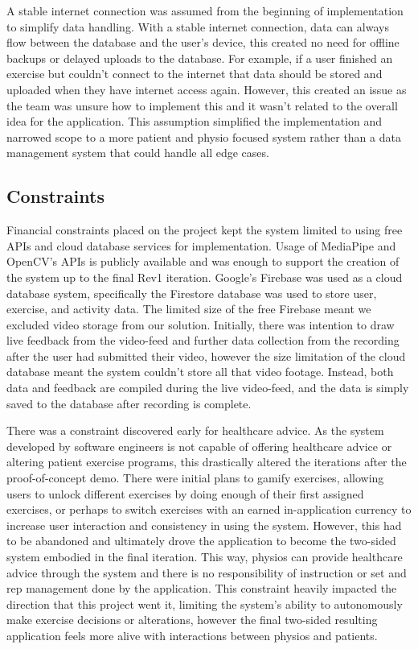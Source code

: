 \documentclass{article}
\begin{document}
A stable internet connection was assumed from the beginning of implementation to simplify data handling. With a stable internet connection, data can always flow between the database and the user’s device, this created no need for offline backups or delayed uploads to the database. For example, if a user finished an exercise but couldn’t connect to the internet that data should be stored and uploaded when they have internet access again. However, this created an issue as the team was unsure how to implement this and it wasn’t related to the overall idea for the application. This assumption simplified the implementation and narrowed scope to a more patient and physio focused system rather than a data management system that could handle all edge cases.

\subsection{Constraints}

Financial constraints placed on the project kept the system limited to using free APIs and cloud database services for implementation. Usage of MediaPipe and OpenCV’s APIs is publicly available and was enough to support the creation of the system up to the final Rev1 iteration. Google’s Firebase was used as a cloud database system, specifically the Firestore database was used to store user, exercise, and activity data. The limited size of the free Firebase meant we excluded video storage from our solution. Initially, there was intention to draw live feedback from the video-feed and further data collection from the recording after the user had submitted their video, however the size limitation of the cloud database meant the system couldn’t store all that video footage. Instead, both data and feedback are compiled during the live video-feed, and the data is simply saved to the database after recording is complete. 

There was a constraint discovered early for healthcare advice. As the system developed by software engineers is not capable of offering healthcare advice or altering patient exercise programs, this drastically altered the iterations after the proof-of-concept demo. There were initial plans to gamify exercises, allowing users to unlock different exercises by doing enough of their first assigned exercises, or perhaps to switch exercises with an earned in-application currency to increase user interaction and consistency in using the system. However, this had to be abandoned and ultimately drove the application to become the two-sided system embodied in the final iteration. This way, physios can provide healthcare advice through the system and there is no responsibility of instruction or set and rep management done by the application. This constraint heavily impacted the direction that this project went it, limiting the system’s ability to autonomously make exercise decisions or alterations, however the final two-sided resulting application feels more alive with interactions between physios and patients.
\end{document}

